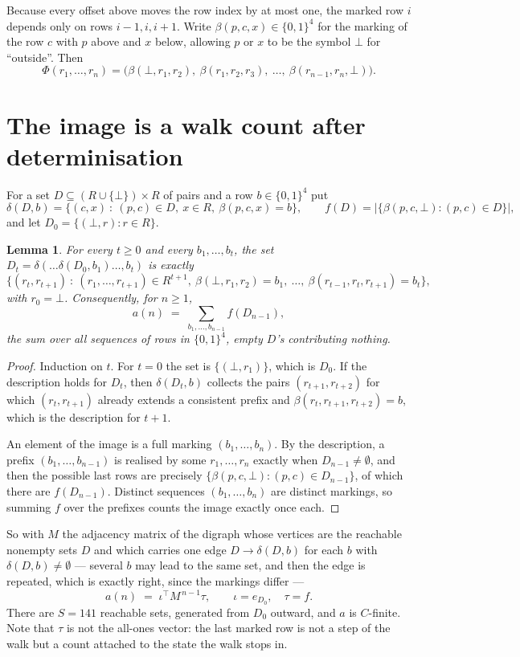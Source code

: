 \documentclass[11pt,a4paper]{article}
\theoremstyle{plain}
\newtheorem{lemma}[theorem]{Lemma}
\theoremstyle{definition}
\begin{document}
Because every offset above moves the row index by at most one, the marked row $i$ depends only
on rows $i-1,i,i+1$. Write $\beta(p,c,x)\in\{0,1\}^{4}$ for the marking of the row $c$
with $p$ above and $x$ below, allowing $p$ or $x$ to be the symbol $\bot$ for ``outside''.
Then
\[
\Phi(r_1,\dots,r_n)=\bigl(\beta(\bot,r_1,r_2),\ \beta(r_1,r_2,r_3),\ \dots,\
\beta(r_{n-1},r_n,\bot)\bigr).
\]

\section{The image is a walk count after determinisation}

For a set $D\subseteq(R\cup\{\bot\})\times R$ of pairs and a row $b\in\{0,1\}^{4}$ put
\[
\delta(D,b)=\{(c,x)\ :\ (p,c)\in D,\ x\in R,\ \beta(p,c,x)=b\},\qquad
f(D)=\bigl|\{\beta(p,c,\bot):(p,c)\in D\}\bigr| ,
\]
and let $D_0=\{(\bot,r):r\in R\}$.

\begin{lemma}\label{lem:det}
For every $t\ge0$ and every $b_1,\dots,b_t$, the set
$D_t=\delta(\dots\delta(D_0,b_1)\dots,b_t)$ is exactly
\[
\{(r_t,r_{t+1})\ :\ (r_1,\dots,r_{t+1})\in R^{t+1},\ \beta(\bot,r_1,r_2)=b_1,\ \dots,\
\beta(r_{t-1},r_t,r_{t+1})=b_t\} ,
\]
with $r_0=\bot$. Consequently, for $n\ge1$,
\[
a(n)\;=\;\sum_{b_1,\dots,b_{n-1}}f(D_{n-1}),
\]
the sum over all sequences of rows in $\{0,1\}^{4}$, empty $D$'s contributing nothing.
\end{lemma}

\begin{proof}
Induction on $t$. For $t=0$ the set is $\{(\bot,r_1)\}$, which is $D_0$. If the description
holds for $D_t$, then $\delta(D_t,b)$ collects the pairs $(r_{t+1},r_{t+2})$ for which
$(r_t,r_{t+1})$ already extends a consistent prefix and
$\beta(r_t,r_{t+1},r_{t+2})=b$, which is the description for $t+1$.

An element of the image is a full marking $(b_1,\dots,b_n)$. By the description, a prefix
$(b_1,\dots,b_{n-1})$ is realised by some $r_1,\dots,r_n$ exactly when $D_{n-1}\neq
\emptyset$, and then the possible last rows are precisely
$\{\beta(p,c,\bot):(p,c)\in D_{n-1}\}$, of which there are $f(D_{n-1})$. Distinct
sequences $(b_1,\dots,b_n)$ are distinct markings, so summing $f$ over the prefixes counts the
image exactly once each.
\end{proof}

So with $M$ the adjacency matrix of the digraph whose vertices are the reachable nonempty sets
$D$ and which carries one edge $D\to\delta(D,b)$ for each $b$ with $\delta(D,b)\neq\emptyset$
--- several $b$ may lead to the same set, and then the edge is repeated, which is exactly
right, since the markings differ ---
\[
a(n)\;=\;\iota^{\!\top}M^{\,n-1}\tau,\qquad \iota=e_{D_0},\quad \tau=f .
\]
There are $S=141$ reachable sets, generated from $D_0$ outward, and $a$ is $C$-finite. Note
that $\tau$ is not the all-ones vector: the last marked row is not a step of the walk but a
count attached to the state the walk stops in.
\end{document}
